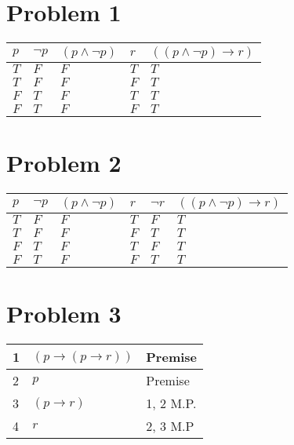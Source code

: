 \documentclass{article}%
\begin{document}
\section*{Problem 1}
\begin{tabular}{| l | l | l | l | l |}
    \hline
    $p$     & $\neg p$  & $(p \wedge \neg p)$   & $r$ & $((p \wedge \neg p) \rightarrow r)$ \\ \hline
    $T$     & $F$       & $F$                   & $T$ & $T$ \\ \hline
    $T$     & $F$       & $F$                   & $F$ & $T$ \\ \hline
    $F$     & $T$       & $F$                   & $T$ & $T$ \\ \hline
    $F$     & $T$       & $F$                   & $F$ & $T$ \\ \hline
\end{tabular}

\section*{Problem 2}
\begin{tabular}{| l | l | l | l | l | l |}
    \hline
    $p$     & $\neg p$  & $(p \wedge \neg p)$   & $r$ & $\neg r$    & $((p \wedge \neg p) \rightarrow r)$ \\ \hline
    $T$     & $F$       & $F$                   & $T$ & $F$         & $T$ \\ \hline
    $T$     & $F$       & $F$                   & $F$ & $T$         & $T$ \\ \hline
    $F$     & $T$       & $F$                   & $T$ & $F$         & $T$ \\ \hline
    $F$     & $T$       & $F$                   & $F$ & $T$         & $T$ \\ \hline
\end{tabular}


\section*{Problem 3}

\begin{tabular}{l l | l}
    1 & $(p \rightarrow (p \rightarrow r))$ & Premise \\ \hline
    2 & $p$ & Premise \\ \hline
    3 & $(p \rightarrow r)$ & 1, 2 M.P. \\ \hline
    4 & $r$ & 2, 3 M.P \\ \hline
\end{tabular}
\end{document}
